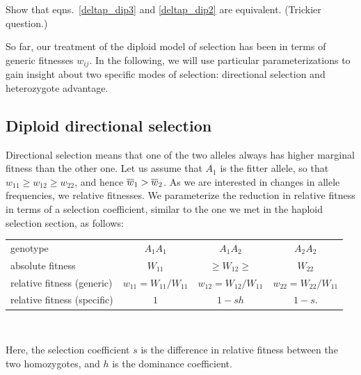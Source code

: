 \begin{question}
Show that eqns.\ \eqref{deltap_dip3} and \eqref{deltap_dip2} are
equivalent. (Trickier question.)\\
\end{question}

So far, our treatment of the diploid model of selection has been in terms of generic fitnesses $w_{ij}$. In the following, we will use particular parameterizations to gain insight about two specific modes of selection: directional selection and heterozygote advantage.

\subsection{Diploid directional selection}
Directional selection means that one of the two alleles always has higher marginal fitness than the other one. Let us assume that $A_1$ is the fitter allele, so that $w_{11} \geq w_{12} \geq w_{22}$, and hence $\overline{w}_1 > \overline{w}_2$. As we are interested in changes in allele frequencies, we  relative fitnesses. We parameterize the reduction in relative fitness in terms of a selection coefficient, similar to the
one we met in the haploid selection section, as follows:\\
\begin{center}
\begin{tabular}{lccc}
genotype & $A_1A_1$ & $A_1A_2$ & $A_2A_2$ \\
absolute fitness & $W_{11}$ & $ \geq W_{12} \geq$ & $W_{22}$ \\
relative fitness (generic) & $w_{11} = W_{11}/W_{11}$ & $w_{12} = W_{12}/W_{11}$ & $w_{22} = W_{22}/W_{11}$ \\
relative fitness  (specific) & $1$ & $1-sh$ & $1-s$. \\
\end{tabular}\\
\end{center}
Here, the selection coefficient $s$ is the difference in relative
fitness between the two homozygotes, and $h$ is the
dominance coefficient. \\

